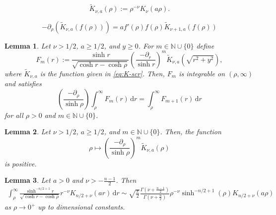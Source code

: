 \documentclass[10pt,a4paper]{amsart}
\newtheorem{lemma}{Lemma}
\begin{document}
\begin{equation} \label{eq:K-scr}
\widetilde{K}_{\nu, a}(\rho) := \rho^{-\nu} K_{\nu}(a\rho).
\end{equation}

\begin{equation} \label{eq:scrK-recurrence}
-\partial_{\rho} (\widetilde{K}_{\nu, a}(f(\rho))) = a f'(\rho) f(\rho) \widetilde{K}_{\nu+1, a}(f(\rho))
\end{equation}

\begin{lemma} \label{lem:recurrence}
Let $\nu > 1/2$, $a \geq 1/2$, and $y \geq 0$. For $m \in \mathbb{N} \cup \lbrace 0 \rbrace$ define
\begin{equation*}
F_{m}(r) := \frac{\sinh r}{\sqrt{\cosh r - \cosh\rho}} \left( \frac{-\partial_{r}}{\sinh r} \right)^{m} \widetilde{K}_{\nu, a}\left( \sqrt{r^{2}+y^{2}} \right),
\end{equation*}
where $\widetilde{K}_{\nu, a}$ is the function given in \eqref{eq:K-scr}. Then, $F_{m}$ is integrable on $(\rho, \infty)$ and satisfies
\begin{equation} \label{eq:recurrence-F}
\left( \frac{-\partial_{\rho}}{\sinh \rho} \right) \int_{\rho}^{\infty} F_{m}(r) \,\mathrm{d}r = \int_{\rho}^{\infty} F_{m+1}(r) \,\mathrm{d}r
\end{equation}
for all $\rho>0$ and $m \in \mathbb{N} \cup \lbrace 0 \rbrace$.
\end{lemma}

\begin{lemma} \label{lem:positivity}
Let $\nu > 1/2$, $a \geq 1/2$, and $m \in \mathbb{N} \cup \lbrace 0 \rbrace$. Then, the function
\begin{equation*}
\rho \mapsto \left( \frac{-\partial_{\rho}}{\sinh \rho} \right)^{m} \widetilde{K}_{\nu,a}(\rho)
\end{equation*}
is positive.
\end{lemma}

\begin{lemma} \label{lem:even_dim}
  Let $a>0$ and $\nu > -\frac{n-1}{2}$. Then
  \begin{align*}
    \int^{\infty}_{\rho} \frac{\sinh^{-n/2+1} r}{\sqrt{\cosh r-\cosh \rho}} r^{-\nu}K_{n/2 + \nu} (ar) \,\mathrm{d} r \sim \sqrt{\frac{\pi}{2}} \frac{\Gamma(\nu+\frac{n-1}{2})}{\Gamma(\nu+\frac{n}{2})} \rho^{-\nu}\sinh^{-n/2 +1} (\rho)K_{n/2+\nu} (a\rho) 
  \end{align*}
  as $\rho \to 0^{+}$ up to dimensional constants.
\end{lemma}
\end{document}
